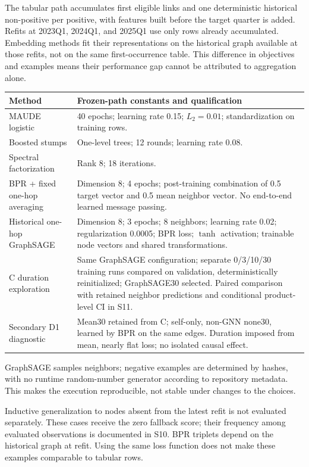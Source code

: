 \documentclass[10pt,a4paper]{article}
\begin{document}
The tabular path accumulates first eligible links and one deterministic historical non-positive per positive, with features built before the target quarter is added. Refits at 2023Q1, 2024Q1, and 2025Q1 use only rows already accumulated. Embedding methods fit their representations on the historical graph available at those refits, not on the same first-occurrence table. This difference in objectives and examples means their performance gap cannot be attributed to aggregation alone.

\begin{tabularx}{\linewidth}{@{}p{36mm}X@{}}
\toprule
Method & Frozen-path constants and qualification\\
\midrule
MAUDE logistic & 40 epochs; learning rate 0.15; $L_2=0.01$; standardization on training rows.\\
Boosted stumps & One-level trees; 12 rounds; learning rate 0.08.\\
Spectral factorization & Rank 8; 18 iterations.\\
BPR + fixed one-hop averaging & Dimension 8; 4 epochs; post-training combination of 0.5 target vector and 0.5 mean neighbor vector. No end-to-end learned message passing.\\
{\raggedright Historical one-hop \mbox{GraphSAGE}\par} & Dimension 8; 3 epochs; 8 neighbors; learning rate 0.02; regularization 0.0005; BPR loss; $\tanh$ activation; trainable node vectors and shared transformations.\\
C duration exploration & Same GraphSAGE configuration; separate 0/3/10/30 training runs compared on validation, deterministically reinitialized; GraphSAGE30 selected. Paired comparison with retained neighbor predictions and conditional product-level CI in S11.\\
Secondary D1 diagnostic & Mean30 retained from C; self-only, non-GNN none30, learned by BPR on the same edges. Duration imposed from mean, nearly flat loss; no isolated causal effect.\\
\bottomrule
\end{tabularx}

GraphSAGE samples neighbors; negative examples are determined by hashes, with no runtime random-number generator according to repository metadata. This makes the execution reproducible, not stable under changes to the choices.

Inductive generalization to nodes absent from the latest refit is not evaluated separately. These cases receive the zero fallback score; their frequency among evaluated observations is documented in S10. BPR triplets depend on the historical graph at refit. Using the same loss function does not make these examples comparable to tabular rows.
\end{document}
